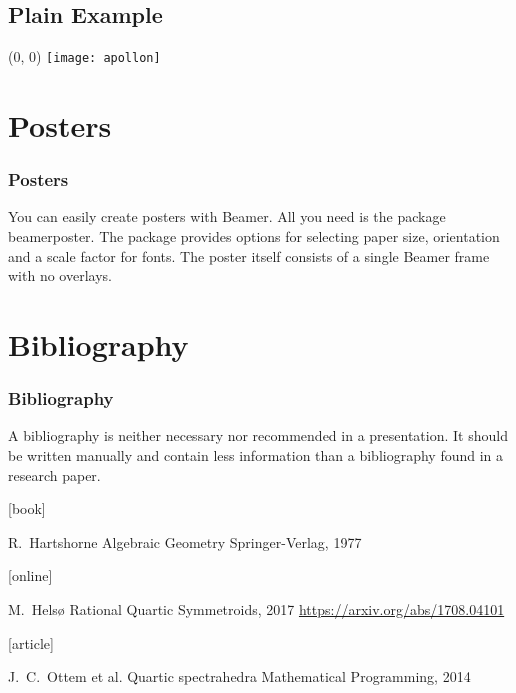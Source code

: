 \documentclass[UKenglish, unknownkeysallowed]{beamer}
\begin{document}
\subsection{Plain Example}


\begin{frame}[plain]
    \begin{textblock}{1}(0, 0)
        \centering
        \texttt{[image: apollon]}
    \end{textblock}
\end{frame}


\section{Posters}


\begin{frame}
    \frametitle{Posters}

    You can easily create posters with Beamer.
    All you need is the package \alert{beamerposter}.
    The package provides options for selecting paper size, orientation and a scale factor for fonts.
    The poster itself consists of a single Beamer frame with no overlays.
\end{frame}


\section{Bibliography}


\begin{frame}
    \frametitle{Bibliography}

    A bibliography is neither necessary nor recommended in a presentation.
    It should be written manually and contain less information
    than a bibliography found in a research paper.

    \begin{thebibliography}{}

        [book]

        R.~Hartshorne
        \newblock Algebraic Geometry
        \newblock Springer-Verlag, 1977

        [online]

        M.~Helsø
        \newblock Rational Quartic Symmetroids, 2017
        \newblock \url{https://arxiv.org/abs/1708.04101}

        [article]

        J.~C.~Ottem et al.
        \newblock Quartic spectrahedra
        \newblock Mathematical Programming, 2014

    \end{thebibliography}
\end{frame}
\end{document}
